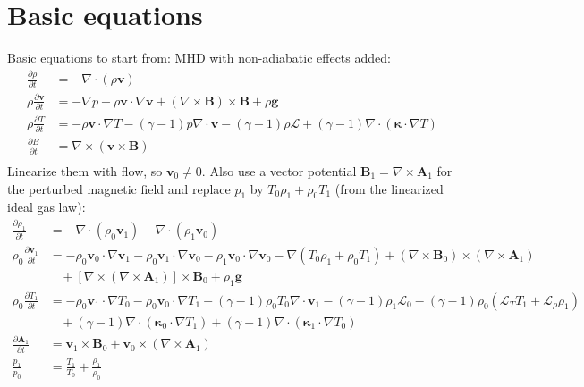 \documentclass[11pt, fleqn]{article}
\newcommand{\HL}{\mathscr{L}}
\newcommand{\bv}{\boldsymbol{v}}
\newcommand{\bb}{\boldsymbol{B}}
\newcommand{\bg}{\boldsymbol{g}}
\newcommand{\bA}{\boldsymbol{A}}
\newcommand{\bkappa}{\boldsymbol{\kappa}}
\begin{document}
\section{Basic equations}
Basic equations to start from: MHD with non-adiabatic effects added:
\begin{equation}
	\begin{aligned}
		\frac{\partial \rho}{\partial t}      &= -\nabla \cdot (\rho \bv)																													\\
		\rho\frac{\partial \bv}{\partial t}   &= -\nabla p - \rho\bv \cdot \nabla\bv + (\nabla \times \bb) \times \bb + \rho\bg																\\
		\rho\frac{\partial T}{\partial t}	  &= -\rho\bv \cdot \nabla T - (\gamma - 1)p\nabla \cdot \bv - (\gamma - 1)\rho\HL + (\gamma - 1)\nabla \cdot (\bkappa \cdot \nabla T)			\\
		\frac{\partial B}{\partial t}		  &= \nabla \times (\bv \times \bb)																												\\
	\end{aligned}
\end{equation}
Linearize them with flow, so $\bv_0 \neq 0$. Also use a vector potential $\bb_1 = \nabla \times \bA_1$ for the perturbed magnetic field and replace $p_1$ by $T_0\rho_1 + \rho_0 T_1$ (from the linearized ideal gas law):
\begin{equation}
	\begin{aligned}
		\frac{\partial \rho_1}{\partial t}		&= -\nabla \cdot (\rho_0\bv_1) - \nabla \cdot (\rho_1\bv_0)	\\
		\rho_0\frac{\partial \bv_1}{\partial t}	&= - \rho_0\bv_0 \cdot \nabla \bv_1 - \rho_0\bv_1 \cdot \nabla \bv_0 - \rho_1\bv_0 \cdot \nabla \bv_0 - \nabla(T_0\rho_1 + \rho_0 T_1) + (\nabla \times \bb_0) \times (\nabla \times \bA_1)		\\
												&~~~~ + \left[\nabla \times (\nabla \times \bA_1) \right] \times \bb_0 + \rho_1 \bg																												\\
		\rho_0\frac{\partial T_1}{\partial t}	&= -\rho_0\bv_1 \cdot \nabla T_0 - \rho_0\bv_0 \cdot \nabla T_1 - (\gamma - 1)\rho_0 T_0 \nabla \cdot \bv_1 - (\gamma - 1)\rho_1 \HL_0 - (\gamma - 1)\rho_0(\HL_T T_1 + \HL_\rho \rho_1)		\\
												&~~~~ +(\gamma - 1)\nabla \cdot (\bkappa_0 \cdot \nabla T_1) + (\gamma - 1)\nabla \cdot (\bkappa_1 \cdot \nabla T_0)																			\\
		\frac{\partial \bA_1}{\partial t}		&= \bv_1 \times \bb_0 + \bv_0 \times (\nabla \times \bA_1)																																		\\
		\frac{p_1}{p_0}							&= \frac{T_1}{T_0} + \frac{\rho_1}{\rho_0}
	\end{aligned}
\end{equation}
\end{document}
